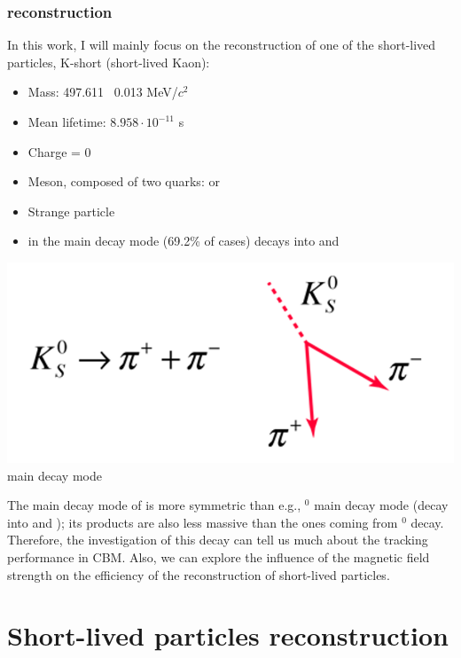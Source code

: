 \documentclass[12pt,a4paper]{report}
\begin{document}
\subsection{\PKshort reconstruction}
\noindent\begin{minipage}{0.6\textwidth}
In this work, I will mainly focus on the reconstruction of one of the short-lived particles, K-short (short-lived Kaon):
\begin{itemize}
    \item Mass: 497.611 \pm\ 0.013 MeV/$c^2$
    \item Mean lifetime: $8.958\cdot 10^{-11}$ s
    \item Charge = 0
    \item Meson, composed of two quarks: \Pdown\APstrange or \Pstrange\APdown
    \item Strange particle
    \item in the main decay mode (69.2\% of cases) decays into \Pgpp and \Pgpm \cite{kdecay2}
\end{itemize}
\end{minipage}
\noindent\begin{minipage}{0.4\textwidth}
    \centering
    \includegraphics[width=\textwidth]{images/kdecay1.png}
    \PKshort main decay mode \cite{kdecay1}
\end{minipage}
The main decay mode of \PKshort is more symmetric than e.g., \PLambda$^0$ main decay mode (decay into \Pproton and \Pgpm); its products are also less massive than the ones coming from \PLambda$^0$ decay. Therefore, the investigation of this decay can tell us much about the tracking performance in CBM. Also, we can explore the influence of the magnetic field strength on the efficiency of the reconstruction of short-lived particles.

\chapter{Short-lived particles reconstruction}
\end{document}
